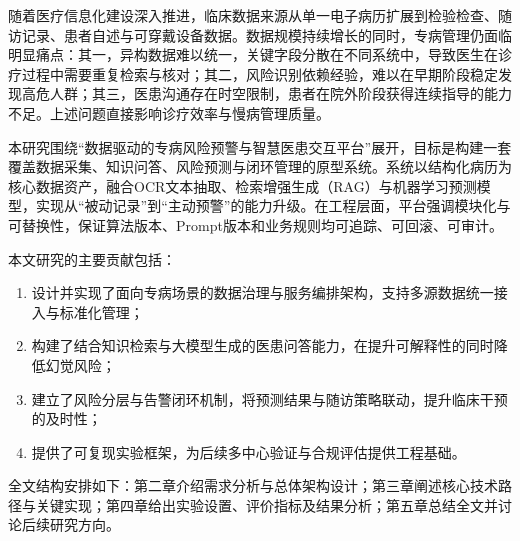 随着医疗信息化建设深入推进，临床数据来源从单一电子病历扩展到检验检查、随访记录、患者自述与可穿戴设备数据。数据规模持续增长的同时，专病管理仍面临明显痛点：其一，异构数据难以统一，关键字段分散在不同系统中，导致医生在诊疗过程中需要重复检索与核对；其二，风险识别依赖经验，难以在早期阶段稳定发现高危人群；其三，医患沟通存在时空限制，患者在院外阶段获得连续指导的能力不足。上述问题直接影响诊疗效率与慢病管理质量。

本研究围绕“数据驱动的专病风险预警与智慧医患交互平台”展开，目标是构建一套覆盖数据采集、知识问答、风险预测与闭环管理的原型系统。系统以结构化病历为核心数据资产，融合OCR文本抽取、检索增强生成（RAG）与机器学习预测模型，实现从“被动记录”到“主动预警”的能力升级。在工程层面，平台强调模块化与可替换性，保证算法版本、Prompt版本和业务规则均可追踪、可回滚、可审计。

本文研究的主要贡献包括：
\begin{enumerate}
  \item 设计并实现了面向专病场景的数据治理与服务编排架构，支持多源数据统一接入与标准化管理；
  \item 构建了结合知识检索与大模型生成的医患问答能力，在提升可解释性的同时降低幻觉风险；
  \item 建立了风险分层与告警闭环机制，将预测结果与随访策略联动，提升临床干预的及时性；
  \item 提供了可复现实验框架，为后续多中心验证与合规评估提供工程基础。
\end{enumerate}

全文结构安排如下：第二章介绍需求分析与总体架构设计；第三章阐述核心技术路径与关键实现；第四章给出实验设置、评价指标及结果分析；第五章总结全文并讨论后续研究方向。